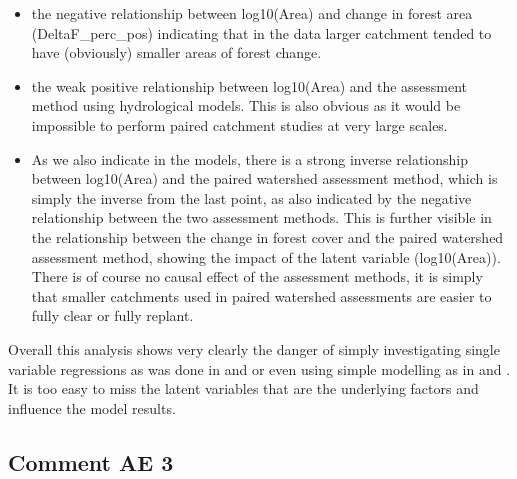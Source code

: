 \documentclass[]{elsarticle} %
\providecommand{\tightlist}{%
  \setlength{\itemsep}{0pt}\setlength{\parskip}{0pt}}
\begin{document}
\begin{itemize}
\tightlist
\item
  the negative relationship between log10(Area) and change in forest area (DeltaF\_perc\_pos) indicating that in the data larger catchment tended to have (obviously) smaller areas of forest change.\\
\item
  the weak positive relationship between log10(Area) and the assessment method using hydrological models. This is also obvious as it would be impossible to perform paired catchment studies at very large scales.\\
\item
  As we also indicate in the models, there is a strong inverse relationship between log10(Area) and the paired watershed assessment method, which is simply the inverse from the last point, as also indicated by the negative relationship between the two assessment methods. This is further visible in the relationship between the change in forest cover and the paired watershed assessment method, showing the impact of the latent variable (log10(Area)). There is of course no causal effect of the assessment methods, it is simply that smaller catchments used in paired watershed assessments are easier to fully clear or fully replant.
\end{itemize}

Overall this analysis shows very clearly the danger of simply investigating single variable regressions as was done in \citet{zhang2017} and \citet{filoso2017} or even using simple modelling as in \citet{jackson2005} and \citet{zhou2015}. It is too easy to miss the latent variables that are the underlying factors and influence the model results.

\hypertarget{comment-ae-3}{%
\subsection{Comment AE 3}\label{comment-ae-3}}
\end{document}

